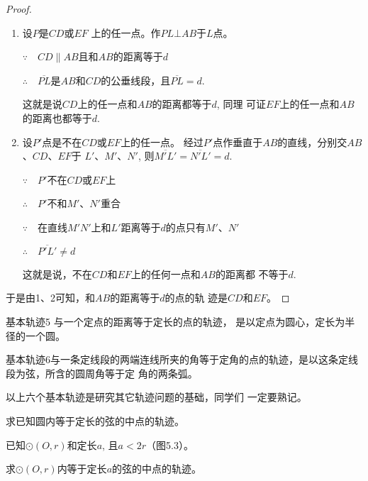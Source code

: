 \begin{proof}
\begin{enumerate}
    \item 设$P$是$CD$或$EF$ 上的任一点。作$PL\bot AB$于$L$点。

$\because\quad CD\parallel AB$且和$AB$的距离等于$d$

$\therefore\quad \overline{PL}$是$AB$和$CD$的公垂线段，且$\overline{PL}=d$.

这就是说$CD$上的任一点和$AB$的距离都等于$d$, 同理
可证$EF$上的任一点和$AB$的距离也都等于$d$.
\item 设$P'$点是不在$CD$或$EF$上的任一点。
经过$P'$点作垂直于$AB$的直线，分别交$AB$、$CD$、$EF$于
$L'$、$M'$、$N'$, 则$\overline{M'L'}=\overline{N'L'}=d$.

$\because\quad P'$不在$CD$或$EF$上

$\therefore\quad P'$不和$M'$、$N'$重合

$\because\quad $在直线$M'N'$上和$L'$距离等于$d$的点只有$M'$、$N'$

$\therefore\quad \overline{P'L'}\ne d$

这就是说，不在$CD$和$EF$上的任何一点和$AB$的距离都
不等于$d$.
\end{enumerate}

于是由1、2可知，和$AB$的距离等于$d$的点的轨
迹是$CD$和$EF$。
\end{proof}

\begin{blk}
    {基本轨迹5} 与一个定点的距离等于定长的点的轨迹，
是以定点为圆心，定长为半径的一个圆。
\end{blk}

\begin{blk}
    {基本轨迹6}与一条定线段的两端连线所夹的角等于定角的点的轨迹，是以这条定线段为弦，所含的圆周角等于定
    角的两条弧。
\end{blk}

以上六个基本轨迹是研究其它轨迹问题的基础，同学们
一定要熟记。

\begin{example}
    求已知圆内等于定长的弦的中点的轨迹。

    已知$\odot (O,r)$和定长$a$, 且$a<2r$（图5.3）。

    求$\odot (O,r)$内等于定长$a$的弦的中点的轨迹。
\end{example}

\begin{figure}[htp]
    \centering
{}
    \caption{}
\end{figure}

